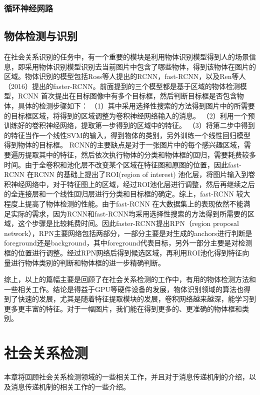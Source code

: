 \subsubsection{循环神经网路}




\subsection{物体检测与识别}

在社会关系识别的任务中，有一个重要的模块是利用物体识别模型得到人的场景信息，即采用物体识别模型识别去当前图片中包含了哪些物体，得到该物体在图片的区域。物体识别的模型包括Ross等人提出的RCNN\cite{girshick2014rich}，fast-RCNN\cite{girshick2015fast}，以及Ren等人（2016）\cite{ren2015faster}提出的faster-RCNN。前面提到的三个模型都是基于区域的物体检测模型，RCNN\cite{girshick2014rich} 首次提出在目标图像中有多个目标框，然后判断目标框是否包含物体，具体的检测步骤如下：
（1）其中采用选择性搜索的方法得到图片中的所需要的目标框区域，将得到的区域调整为卷积神经网络输入的消息。
（2）利用一个预训练好的卷积神经网络，提取第一步得到的区域中的特征。
（3）将第二步中得到的特征当作一个线性SVM的输入，得到物体的类别，另外训练一个线性回归模型得到物体的目标框。
RCNN的主要缺点是对于一张图片中的每个感兴趣区域，需要遍历提取其中的特征，然后依次执行物体的分类和物体框的回归，需要耗费较多时间。由于全卷积和池化层不改变某个区域在特征图和原图的位置，因此fast-RCNN 在RCNN 的基础上提出了ROI(region of interest) 池化层，将图片输入到卷积神经网络中，对于特征图上的区域，经过ROI池化层进行调整，然后再继续之后的全连接层和一个线性回归层进行分类和目标框的确定。综上，fast-RCNN 较大程度上提高了物体检测的性能。由于fast-RCNN 在大数据集上的表现依然不能满足实际的需求，因为RCNN和fast-RCNN均采用选择性搜索的方法得到所需要的区域，这个步骤是比较耗费时间。因此faster-RCNN提出RPN（region proposal network），RPN主要网络包括两部分，一部分主要是对生成的anchors进行判断是foreground还是background，其中foreground代表目标，另外一部分主要是对检测框的位置进行调整。经过RPN网络后得到候选区域，再利用ROI池化得到特征向量进行物体类别的判断和物体框的进一步精确判断。

综上，以上的篇幅主要是回顾了在社会关系检测的工作中，有用的物体检测方法和一些相关工作。结论是得益于GPU等硬件设备的发展，物体识别领域的算法也得到了快速的发展，尤其是随着特征提取模块的发展，卷积网络越来越深，能学习到更多更丰富的特征。对于一幅图片，我们能在得到更多的、更准确的物体框和类别。

\section{社会关系检测}
本章将回顾社会关系检测领域的一些相关工作，并且对于消息传递机制的介绍，以及消息传递机制的相关工作的一些介绍。

